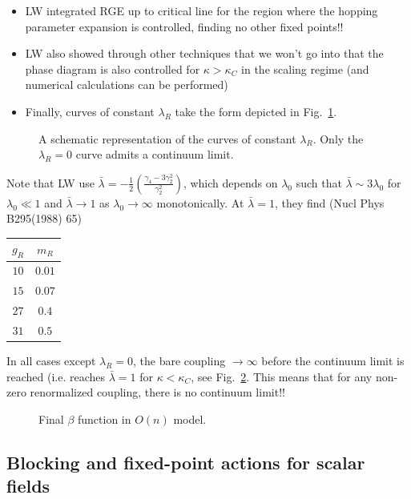 \begin{itemize}
    \item LW integrated RGE up to critical line for the region where the hopping parameter expansion is controlled, finding no other fixed points!!
    \item LW also showed through other techniques that we won't go into that the phase diagram is also controlled for $\kappa > \kappa_C$ in the scaling regime (and numerical calculations can be performed)
    \item Finally, curves of constant $\lambda_R$ take the form depicted in Fig.~\ref{fig:lam0_curves}. 
\end{itemize}
\begin{figure}
    \centering
    \caption{A schematic representation of the curves of constant $\lambda_R$. Only the $\lambda_R = 0$ curve admits a continuum limit.}
    \label{fig:lam0_curves}
\end{figure}

Note that LW use $\bar{\lambda} = - \frac{1}{2} \left(\frac{\gamma_4 - 3 \gamma_2^2}{\gamma_2^2}\right)$, which depends on $\lambda_0$ such that $\bar{\lambda} \sim 3 \lambda_0$ for $\lambda_0 \ll 1$ and $\bar{\lambda} \rightarrow 1$ as $\lambda_0 \rightarrow \infty$ monotonically. At $\bar{\lambda} = 1$, they find (Nucl Phys B295(1988) 65)

\begin{table}[h]
\centering
\begin{tabular}{c|c}
    $g_R$ & $m_R$ \\
    \hline
    $10$ & $0.01$ \\
    $15$ & $0.07$ \\
    $27$ & $0.4$ \\
    $31$ & $0.5$
\end{tabular}
\end{table}
In all cases except $\lambda_R = 0$, the bare coupling $\rightarrow \infty$ before the continuum limit is reached (i.e. reaches $\bar{\lambda} = 1$ for $\kappa < \kappa_C$, see Fig.~\ref{fig:On_beta_func_final}. This means that for any non-zero renormalized coupling, there is no continuum limit!!
\begin{figure}
    \centering
    \caption{Final $\beta$ function in $O(n)$ model.
    \label{fig:On_beta_func_final}}
\end{figure}



\subsection{Blocking and fixed-point actions for scalar fields}

